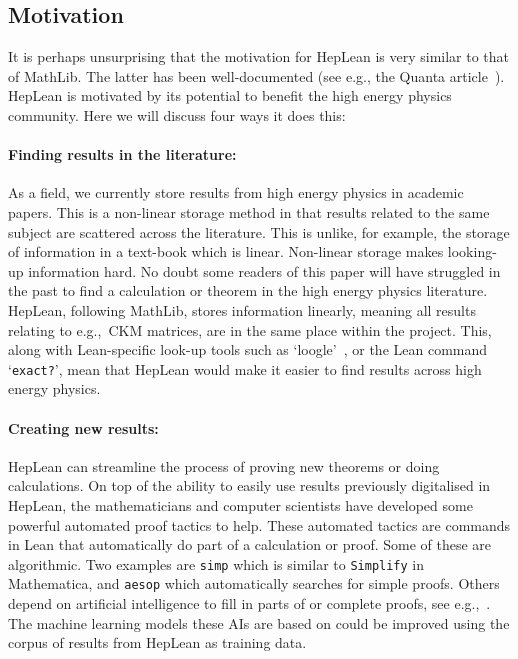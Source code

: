 \documentclass[a4paper, 11pt]{article}
\begin{document}
\subsection{Motivation}\label{sec:Motivation}
It is perhaps unsurprising that the motivation for HepLean is very similar to that of MathLib. The latter has been well-documented (see e.g., the Quanta article~\cite{Quanta}).  HepLean is motivated by its potential to benefit the high energy physics community. Here we will discuss four ways it does this:


\paragraph{Finding results in the literature:}

As a field, we currently store results from high energy physics in academic papers. This is a non-linear storage method in that results related to the same subject are scattered across the literature. This is unlike, for example, the storage of information in a text-book which is linear. Non-linear storage makes looking-up information hard. No doubt some readers of this paper will have struggled in the past to find a calculation or theorem in the high energy physics literature. HepLean, following MathLib, stores information linearly, meaning all results relating to e.g.,\ CKM matrices, are in the same place within the project. This, along with Lean-specific look-up tools such as `loogle'~\cite{loogle}, or the Lean command `\lstinline[language = {}]|exact?|', mean that HepLean would  make it easier to find results across high energy physics.
  
  
\paragraph{Creating new results:}
 HepLean can streamline the process of proving new
theorems or doing calculations.
 On top of the ability to easily use results previously digitalised in HepLean, the mathematicians and computer scientists have
developed some powerful automated proof tactics to help. These automated tactics are commands in Lean that automatically do
part of a calculation or proof. 
 Some of these are algorithmic. Two examples are  \lstinline[language = {}]|simp|  which is similar to \lstinline[language = {}]|Simplify| in Mathematica,
 and \lstinline[language = {}]|aesop| which automatically searches for simple proofs. Others depend on artificial intelligence to fill in parts of or complete proofs, see e.g.,~\cite{LeanDojo}.  The machine learning models these AIs are based on could be improved using
the corpus of results from HepLean as training data.
  
\end{document}
